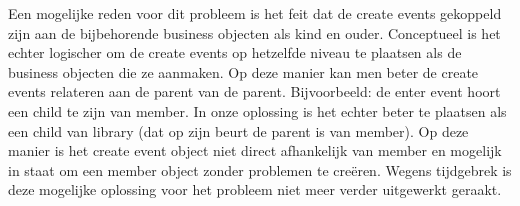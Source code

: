 Een mogelijke reden voor dit probleem is het feit dat de create events gekoppeld zijn aan de bijbehorende business objecten als kind en ouder. Conceptueel is het echter logischer
om de create events op hetzelfde niveau te plaatsen als de business objecten die ze aanmaken. Op deze manier kan men beter de create events relateren aan de parent van de parent.
Bijvoorbeeld: de enter event hoort een child te zijn van member. In onze oplossing is het echter beter te plaatsen als een child van library (dat op zijn beurt de parent is van member).
Op deze manier is het create event object niet direct afhankelijk van member en mogelijk in staat om een member object zonder problemen te cre\"eren. 
Wegens tijdgebrek is deze mogelijke oplossing voor het probleem niet meer verder uitgewerkt geraakt.
